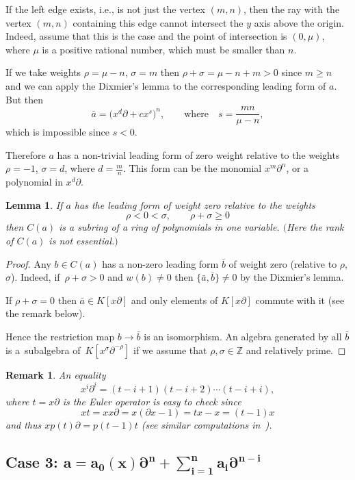 \documentclass[pdftex]{sigma}
\numberwithin{equation}{section}
\newtheorem{Lemma}[Theorem]{Lemma}
\newtheorem{Remark}[Theorem]{Remark} }
\newcommand{\de}{\partial}
\newcommand{\Z}{\mathbb Z}
\newcommand{\si}{\sigma}
\begin{document}
If the left edge exists, i.e., is not just the vertex $(m,n)$, then the ray with the vertex $(m,n)$ containing this edge cannot intersect the $y$ axis above the origin.
Indeed, assume that this is the case and the point of intersection is $(0, \mu)$, where $\mu$ is a positive rational number, which must be smaller than $n$.

If we take weights $\rho = \mu - n$, $\si = m$ then $\rho + \si = \mu - n + m > 0$ since $m \geq n$ and we can apply the Dixmier's lemma to the corresponding leading form of $a$.
But then
\[
\bar{a} = \big(x^d\de + cx^s\big)^n, \qquad
\text{where}\quad s = \frac{mn}{\mu - n},
\]
which is impossible since $s < 0$.

Therefore $a$ has a non-trivial leading form of zero weight relative to the weights $\rho = -1$, $\si = d$, where $d = \frac{m}{n}$. This form can be the monomial $x^m\de^n$, or a polynomial in $x^d\de$.

\begin{Lemma}\label{lemma1}
If $a$ has the leading form of weight zero relative to the weights
\[
\rho < 0 < \sigma, \qquad
\rho + \sigma \geq 0
\]
then $C(a)$ is a subring of
a ring of polynomials in one variable. $($Here the rank of $C(a)$ is not essential.$)$
\end{Lemma}

\begin{proof}
Any $b \in C(a)$ has a non-zero leading form $\bar{b}$ of weight zero (relative to $\rho$, $\sigma$).
Indeed, if~$\rho + \sigma > 0$ and $w(b) \ne 0$ then $\big\{\bar{a}, \bar{b}\big\} \ne 0$ by the Dixmier's lemma.

If $\rho + \sigma = 0$ then $\bar{a} \in K[x\de]$ and only elements of $K[x\de]$
commute with it (see the remark below).

Hence the restriction map $b \rightarrow \bar{b}$ is an isomorphism. An algebra generated by all $\bar{b}$ is a~subalgebra of~$K[x^{\sigma}\de^{-\rho}]$ if we assume that $\rho, \sigma \in \Z$ and relatively prime.
\end{proof}

\begin{Remark}
 An equality
 \[
 x^i\de^i = (t-i+1)(t-i+2)\cdots(t-i+i),
 \]
 where $t = x\de$ is the Euler operator is easy to check since
 \[
 xt = xx\de = x(\de x - 1) = tx - x = (t-1)x
 \]
and thus
$xp(t)\de = p(t-1)t$ (see similar computations in~\cite{BC2}).
\end{Remark}

\subsection*{Case 3: $\boldsymbol{\displaystyle a = a_0(x)\de^n + \sum\limits_{i=1}^n a_i\de^{n-i}}$}
\end{document}
